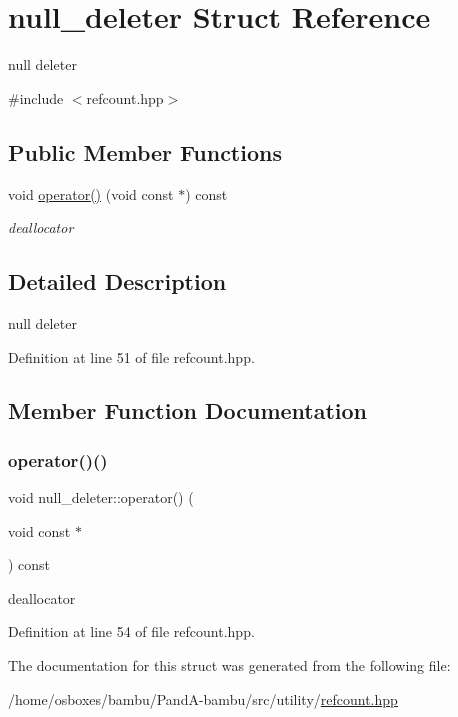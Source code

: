 \hypertarget{structnull__deleter}{}\section{null\+\_\+deleter Struct Reference}
\label{structnull__deleter}


null deleter  




{\ttfamily \#include $<$refcount.\+hpp$>$}

\subsection*{Public Member Functions}
\begin{DoxyCompactItemize}
\item 
void \hyperlink{structnull__deleter_a91906cb465e6905603e140f0cf80f5fd}{operator()} (void const $\ast$) const
\begin{DoxyCompactList}\small\item\em deallocator \end{DoxyCompactList}\end{DoxyCompactItemize}


\subsection{Detailed Description}
null deleter 

Definition at line 51 of file refcount.\+hpp.



\subsection{Member Function Documentation}
\mbox{\label{structnull__deleter_a91906cb465e6905603e140f0cf80f5fd}} 
\subsubsection{\texorpdfstring{operator()()}{operator()()}}
{\footnotesize\ttfamily void null\+\_\+deleter\+::operator() (\begin{DoxyParamCaption}\item[{void const $\ast$}]{ }\end{DoxyParamCaption}) const\hspace{0.3cm}{\ttfamily [inline]}}



deallocator 



Definition at line 54 of file refcount.\+hpp.



The documentation for this struct was generated from the following file\+:\begin{DoxyCompactItemize}
\item 
/home/osboxes/bambu/\+Pand\+A-\/bambu/src/utility/\hyperlink{refcount_8hpp}{refcount.\+hpp}\end{DoxyCompactItemize}
